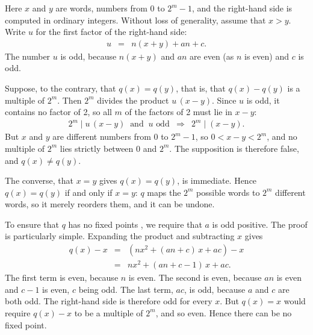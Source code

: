 Here $x$ and $y$ are words, numbers from $0$ to $2^m - 1$, and the right-hand
side is computed in ordinary integers. Without loss of generality, assume that $x > y$. Write $u$ for 
the first factor of the right-hand side:
\begin{eqnarray}
u &=& n(x+y) + an + c. \label{eq:qinj_C}
\end{eqnarray}
The number $u$ is odd, because $n(x+y)$ and $an$ are even (as $n$ is even) and
$c$ is odd.

Suppose, to the contrary, that $q(x) = q(y)$, that is, that $q(x) - q(y)$ is a
multiple of $2^m$. Then $2^m$ divides the product $u\,(x-y)$. Since $u$ is odd,
it contains no factor of 2, so all $m$ of the factors of 2 must lie in $x - y$:
\begin{eqnarray}
2^m \mid u\,(x-y) \ \text{ and } \ u \text{ odd} &\Longrightarrow& 2^m \mid (x-y).
\label{eq:qinj_D}
\end{eqnarray}
But $x$ and $y$ are different numbers from $0$ to $2^m - 1$, so
$0 < x - y < 2^m$, and no multiple of $2^m$ lies strictly between $0$ and
$2^m$. The supposition is therefore false, and $q(x) \neq q(y)$.

The converse, that $x = y$ gives $q(x) = q(y)$, is immediate. Hence
$q(x) = q(y)$ if and only if $x = y$: $q$ maps the $2^m$ possible words to
$2^m$ different words, so it merely reorders them, and it can be undone.

To ensure that  $q$ has no fixed points , we require
that  $a$ is odd positive. The proof is particularly simple.
Expanding the product and subtracting $x$ gives
\begin{eqnarray}
q(x) - x &=& \left( n x^2 + (an+c)\,x + ac \right) - x \label{eq:qfix_A} \\
 &=& n x^2 + (an + c - 1)\,x + ac. \label{eq:qfix_B}
\end{eqnarray}
The first term is even, because $n$ is even. The second is even, because $an$
is even and $c - 1$ is even, $c$ being odd. The last term, $ac$, is odd,
because $a$ and $c$ are both odd. The right-hand side is therefore odd for
every $x$. But $q(x) = x$ would require $q(x) - x$ to be a multiple of $2^m$,
and so even. Hence there can be no fixed point.

